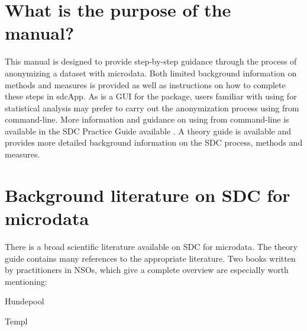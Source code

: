 \documentclass[letterpaper,10pt,english]{sphinxmanual}
\begin{document}
\section{What is the purpose of the manual?}
\label{\detokenize{introduction:what-is-the-purpose-of-the-manual}}
This manual is designed to provide step-by-step guidance through the process of anonymizing a
dataset with microdata. Both limited background information on methods and measures is
provided as well as instructions on how to complete these steps in sdcApp. As  is a
GUI for the  package, users familiar with using  for statistical analysis
may prefer to carry out the anonymization process using  from command-line.
More information and guidance on using  from command-line
is available in the SDC Practice Guide available .
A theory guide is available 
and provides more detailed background information on the SDC process, methods and measures.


\section{Background literature on SDC for microdata}
\label{\detokenize{introduction:background-literature-on-sdc-for-microdata}}
There is a broad scientific literature available on SDC for microdata. The theory guide
contains many references to the appropriate literature. Two books written by practitioners in
NSOs, which give a complete overview are especially worth mentioning:

Hundepool

Templ
\end{document}
